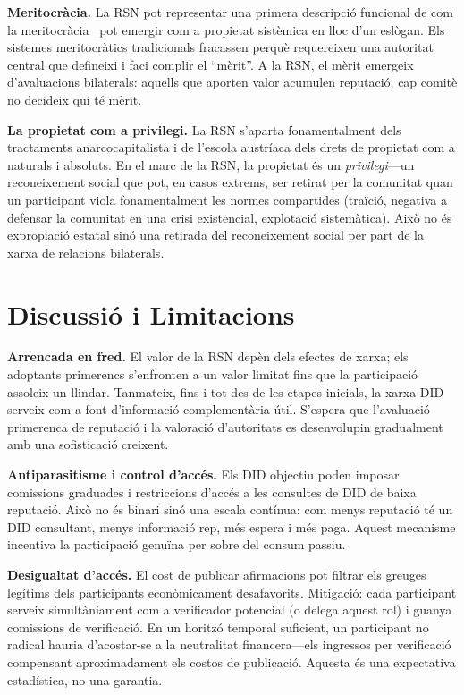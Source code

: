 \documentclass[11pt,a4paper,twocolumn]{article}
\begin{document}
\textbf{Meritocràcia.} La RSN pot representar una primera descripció funcional de com la meritocràcia~\cite{young1958} pot emergir com a propietat sistèmica en lloc d'un eslògan. Els sistemes meritocràtics tradicionals fracassen perquè requereixen una autoritat central que defineixi i faci complir el ``mèrit''. A la RSN, el mèrit emergeix d'avaluacions bilaterals: aquells que aporten valor acumulen reputació; cap comitè no decideix qui té mèrit.

\textbf{La propietat com a privilegi.} La RSN s'aparta fonamentalment dels tractaments anarcocapitalista i de l'escola austríaca dels drets de propietat com a naturals i absoluts. En el marc de la RSN, la propietat és un \emph{privilegi}---un reconeixement social que pot, en casos extrems, ser retirat per la comunitat quan un participant viola fonamentalment les normes compartides (traïció, negativa a defensar la comunitat en una crisi existencial, explotació sistemàtica). Això no és expropiació estatal sinó una retirada del reconeixement social per part de la xarxa de relacions bilaterals.

\section{Discussió i Limitacions}

\textbf{Arrencada en fred.} El valor de la RSN depèn dels efectes de xarxa; els adoptants primerencs s'enfronten a un valor limitat fins que la participació assoleix un llindar. Tanmateix, fins i tot des de les etapes inicials, la xarxa DID serveix com a font d'informació complementària útil. S'espera que l'avaluació primerenca de reputació i la valoració d'autoritats es desenvolupin gradualment amb una sofisticació creixent.

\textbf{Antiparasitisme i control d'accés.} Els DID objectiu poden imposar comissions graduades i restriccions d'accés a les consultes de DID de baixa reputació. Això no és binari sinó una escala contínua: com menys reputació té un DID consultant, menys informació rep, més espera i més paga. Aquest mecanisme incentiva la participació genuïna per sobre del consum passiu.

\textbf{Desigualtat d'accés.} El cost de publicar afirmacions pot filtrar els greuges legítims dels participants econòmicament desafavorits. Mitigació: cada participant serveix simultàniament com a verificador potencial (o delega aquest rol) i guanya comissions de verificació. En un horitzó temporal suficient, un participant no radical hauria d'acostar-se a la neutralitat financera---els ingressos per verificació compensant aproximadament els costos de publicació. Aquesta és una expectativa estadística, no una garantia.
\end{document}

